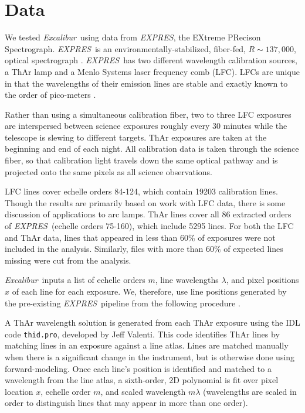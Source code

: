 \documentclass[modern]{aastex63}
\newcommand{\project}[1]{\textsl{#1}}
\newcommand{\name}{\project{Excalibur}}
\newcommand{\acronym}[1]{{\small{#1}}}
\newcommand{\expres}{\project{\acronym{EXPRES}}}
\begin{document}
\section{Data} \label{sec:data}
We tested \name\ using data from \expres, the EXtreme PRecison Spectrograph.  \expres\ is an environmentally-stabilized, fiber-fed, $R\sim137,000$, optical spectrograph \citep{jurgenson2016, blackman2020}.  \expres\ has two different wavelength calibration sources, a ThAr lamp and a Menlo Systems laser frequency comb (LFC).  LFCs are unique in that the wavelengths of their emission lines are stable and exactly known to the order of pico-meters  \citep{wilken2012, molaro2013, probst2014}.

Rather than using a simultaneous calibration fiber, two to three LFC exposures are interspersed between science exposures roughly every 30 minutes while the telescope is slewing to different targets.  ThAr exposures are taken at the beginning and end of each night.  All calibration data is taken through the science fiber, so that calibration light travels down the same optical pathway and is projected onto the same pixels as all science observations.

LFC lines cover echelle orders 84-124, which contain 19203 calibration lines.  Though the results are primarily based on work with LFC data, there is some discussion of applications to arc lamps.   ThAr lines cover all 86 extracted orders of \expres\ (echelle orders 75-160), which include 5295 lines.  For both the LFC and ThAr data, lines that appeared in less than 60\% of exposures were not included in the analysis.  Similarly, files with more than 60\% of expected lines missing were cut from the analysis.  

 \name\ inputs a list of echelle orders $m$, line wavelengths $\lambda$, and pixel positions $x$ of each line for each exposure.  We, therefore, use line positions generated by the pre-existing \expres\ pipeline from the following procedure \citep{petersburg2020}.
 
 A ThAr wavelength solution is generated from each ThAr exposure using the IDL code \texttt{thid.pro}, developed by Jeff Valenti.  This code identifies ThAr lines by matching lines in an exposure against a line atlas.  Lines are matched manually when there is a significant change in the instrument, but is otherwise done using forward-modeling.  Once each line's position is identified and matched to a wavelength from the line atlas, a sixth-order, 2D polynomial is fit over pixel location $x$, echelle order $m$, and scaled wavelength $m\lambda$ (wavelengths are scaled in order to distinguish lines that may appear in more than one order).
 
\end{document}

